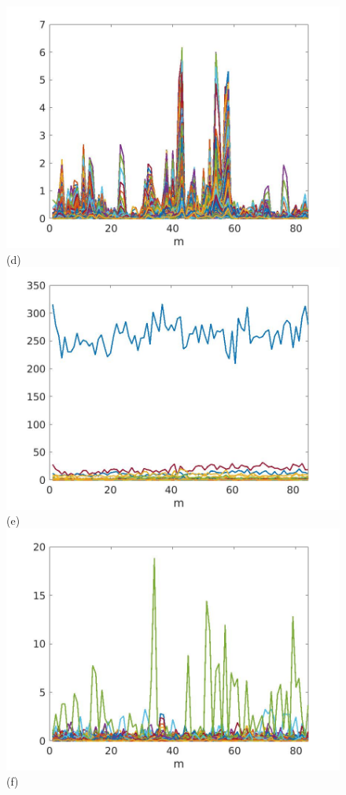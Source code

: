 \documentclass[journal]{IEEEtran}
\begin{document}
\begin{figure}[htp!]
\includegraphics[scale=.12]{../../figs/consecdif_J3_VV_sqrdif_change_locations}(d)\\
\includegraphics[scale=.12]{../../figs/J3_VV_sqrdif_lowest_cor_locations}(e)
\includegraphics[scale=.12]{../../figs/consecdif_J3_VV_sqrdif_lowest_cor_locations}(f)\\

\end{figure}
\end{document}
